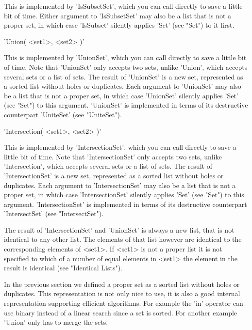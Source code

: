 This is implemented by 'IsSubsetSet', which you can call directly to save
a little  bit of  time.  Either argument to  'IsSubsetSet' may also  be a
list that is not a proper set, in which  case 'IsSubset' silently applies
'Set' (see "Set") to it first.

'Union( <set1>, <set2> )'%

This is implemented by 'UnionSet', which you can call  directly to save a
little bit of time.  Note that  'UnionSet' only accepts two  sets, unlike
'Union',  which accepts several sets or  a list of  sets.  The  result of
'UnionSet' is a new set,  represented as  a sorted list  without holes or
duplicates.  Each argument to 'UnionSet' may also be a list that is not a
proper set, in which case 'UnionSet'  silently  applies 'Set' (see "Set")
to this argument.  'UnionSet' is implemented in terms of its  destructive
counterpart 'UniteSet' (see "UniteSet").

'Intersection( <set1>, <set2> )'%

This is implemented by 'IntersectionSet', which you can call  directly to
save a little bit of time.  Note that 'IntersectionSet'  only accepts two
sets, unlike 'Intersection',  which  accepts several sets  or  a list  of
sets.  The  result of 'IntersectionSet' is  a new  set,  represented as a
sorted  list     without  holes   or  duplicates.   Each   argument    to
'IntersectionSet' may also be a list  that is not  a proper set, in which
case  'IntersectionSet'  silently  applies  'Set' (see  "Set")    to this
argument.  'IntersectionSet' is implemented in  terms of its  destructive
counterpart 'IntersectSet' (see "IntersectSet").

The result of 'IntersectionSet' and 'UnionSet' is always a new list, that
is not  identical to any other list.   The elements of that  list however
are identical to the corresponding elements of <set1>.   If <set1> is not
a proper list it is not specified to which of a number  of equal elements
in <set1> the element in the result is identical (see "Identical Lists").


In the previous section we defined a proper  set as a sorted list without
holes or duplicates.  This representation is not  only nice to use, it is
also a good internal representation supporting efficient algorithms.  For
example the 'in' operator can use binary instead of a linear search since
a set is sorted.  For another example 'Union' only has to merge the sets.

